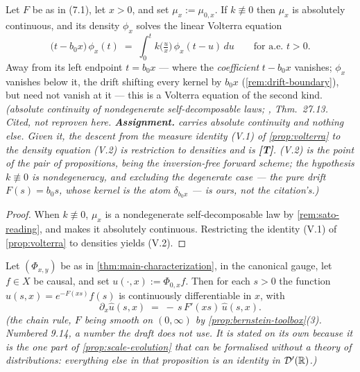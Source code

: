 \begin{proposition}\label{prop:volterra-density}
Let $F$ be as in (7.1), let $x > 0$, and set $\mu_x := \mu_{0,x}$. If $k \not\equiv 0$ then
$\mu_x$ is absolutely continuous, and its density $\phi_x$ solves the linear Volterra equation
\[
  \bigl(t - b_0 x\bigr)\,\phi_x(t)
  \;=\; \int_0^t k\bigl(\tfrac{u}{x}\bigr)\,\phi_x(t - u)\,du
  \qquad \text{for a.e.\ } t > 0. \tag{V.2}
\]
Away from its left endpoint $t = b_0 x$ --- where the \emph{coefficient} $t - b_0 x$
vanishes; $\phi_x$ vanishes below it, the drift shifting every kernel by $b_0 x$
(\ref{rem:drift-boundary}), but need not vanish at it --- this is a Volterra equation of the
second kind.
\statusA\quad{}\quad\emph{(absolute continuity of nondegenerate self-decomposable
laws; , Thm.~27.13. Cited, not reproven here.
\textbf{Assignment.}  carries absolute continuity and nothing else. Given it, the
descent from the measure identity (V.1) of \ref{prop:volterra} to the density equation (V.2) is
restriction to densities and is \textbf{[T]}. (V.2) is the point of the pair of propositions,
being the inversion-free forward scheme; the hypothesis $k \not\equiv 0$ is nondegeneracy, and
excluding the degenerate case --- the pure drift $F(s) = b_0 s$, whose kernel is the atom
$\delta_{b_0 x}$ --- is ours, not the citation's.)}
\end{proposition}

\begin{proof}
When $k \not\equiv 0$, $\mu_x$ is a nondegenerate self-decomposable law by
\ref{rem:sato-reading}, and  makes it absolutely continuous. Restricting the
identity (V.1) of \ref{prop:volterra} to densities yields (V.2).
\end{proof}

\begin{lemma}\label{lem:transform-ode}
Let $(\Phi_{x,y})$ be as in \ref{thm:main-characterization}, in the canonical gauge, let
$f \in X$ be causal, and set $u(\cdot, x) := \Phi_{0,x} f$. Then for each $s > 0$ the function
$\hat u(s, x) = e^{-F(xs)}\hat f(s)$ is continuously differentiable in $x$, with
\[
  \partial_x \hat u(s, x) \;=\; -\,s\,F'(xs)\,\hat u(s, x).
\]
\statusT\quad\emph{(the chain rule, $F$ being smooth on $(0,\infty)$ by
\ref{prop:bernstein-toolbox}(3). Numbered 9.14, a number the draft does not use. It is stated on
its own because it is the one part of \ref{prop:scale-evolution} that can be formalised without
a theory of distributions: everything else in that proposition is an identity in
$\mathcal{D}'(\mathbb{R})$.)}
\end{lemma}

